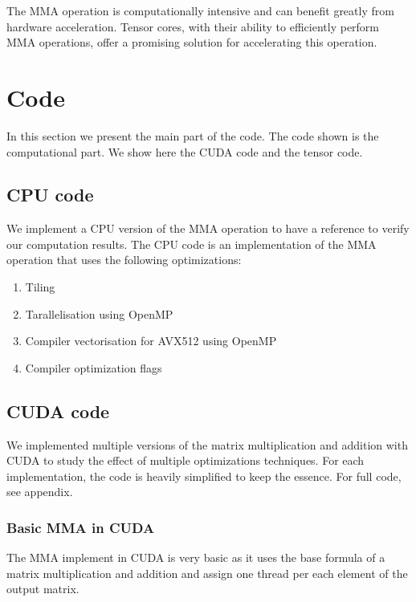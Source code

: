 \documentclass[conference]{IEEEtran}
\begin{document}
  The MMA operation is computationally intensive and can benefit greatly from hardware acceleration. 
  Tensor cores, with their ability to efficiently perform MMA operations, offer a promising solution 
  for accelerating this operation.
  
  
  \section{Code}
  In this section we present the main part of the code. The code shown is the computational part. 
  We show here the CUDA code and the tensor code.

  \subsection{CPU code}\label{sec:CPUCode}
  We implement a CPU version of the MMA operation to have a reference to verify our computation results.
  The CPU code is an implementation of the MMA operation that uses the following optimizations:
  \begin{enumerate}
    \item Tiling
    \item Tarallelisation using OpenMP
    \item Compiler vectorisation for AVX512 using OpenMP
    \item Compiler optimization flags
  \end{enumerate}


  \subsection{CUDA code}\label{sec:CudaCode}
  We implemented multiple versions of the matrix multiplication and addition with CUDA to
  study the effect of multiple optimizations techniques. For each implementation, 
  the code is heavily simplified to keep the essence. For full code, see appendix.

  \subsubsection[short]{Basic MMA in CUDA}
  The MMA implement in CUDA is very basic as it uses the base formula of a matrix multiplication
  and addition and assign one thread per each element of the output matrix.\cite{Cpp_programming}
\end{document}
